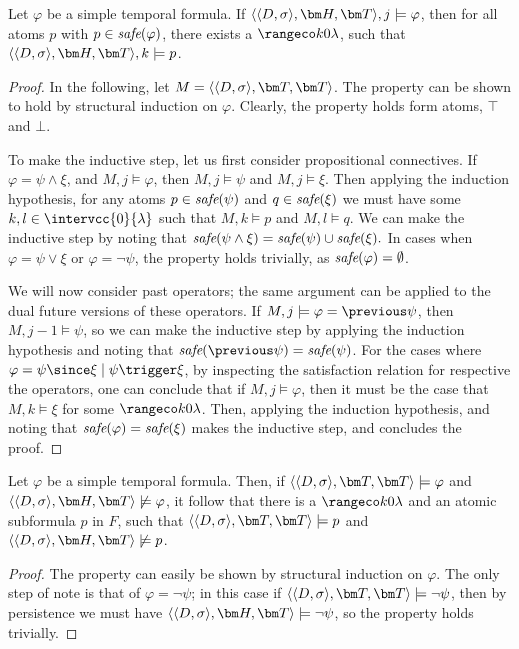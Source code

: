 \begin{lemma}\label{lemma:safe-atomic-subformula-satisfied}
  Let $\varphi$ be a simple temporal formula. If
  $\qthandt,j \models \varphi$, then for all atoms $p$ with
  $p \in \textit{safe}(\varphi)$, there exists a $\kinlambda$, such that
  $\qthandt,k \models p$.
\end{lemma}
\begin{proof}
  In the following, let $M=\qttandt$. The property can be shown to
  hold by structural induction on $\varphi$. Clearly, the property
  holds form atoms, $\top$ and $\bot$.

To make the inductive step, let us first consider propositional
connectives. If $\varphi = \psi \wedge \xi$, and $M,j \models
\varphi$, then $M,j \models \psi$ and $M,j \models \xi$. Then applying
the induction hypothesis, for any atoms $p \in \textit{safe}(\psi)$ and $q \in
\textit{safe}(\xi)$ we must have some $k,l \in \intervcc{0}{\lambda}$ such
that $M,k \models p$ and $M,l \models q$. We can make the
inductive step by noting that $\textit{safe}(\psi \wedge \xi) = \textit{safe}(\psi)
\cup \textit{safe}(\xi).$ In cases when $\varphi = \psi \vee \xi$ or $\varphi
= \neg \psi$, the property holds trivially, as $\textit{safe}(\varphi) =
\emptyset$.

We will now consider past operators; the same argument can be applied
to the dual future versions of these operators. If
$M,j \models \varphi = \previous \psi$, then $M,j-1 \models \psi$, so
we can make the inductive step by applying the induction hypothesis
and noting that $\safe{\previous \psi} = \safe{\psi}$. For the cases
where $\varphi = \psi \since \xi \mid \psi \trigger \xi$, by
inspecting the satisfaction relation for respective the operators, one
can conclude that if $M,j \models \varphi$, then it must be the case
that $M,k \models \xi$ for some $\kinlambda$. Then, applying the
induction hypothesis, and noting that $\textit{safe}(\varphi) = \textit{safe}(\xi)$
makes the inductive step, and concludes the proof.
  
\end{proof}

\begin{lemma}\label{lemma:t-not-h-atomic-subformula}
  Let $\varphi$ be a simple temporal formula. Then, if
  $\qttandt \models \varphi$ and \\
  $\qthandt \not\models \varphi$, it follow that there is a
  $\kinlambda$ and an atomic subformula $p$ in $F$, such that
  $\qttandt \models p$ and $\qthandt \not\models p$.
\end{lemma}
\begin{proof}
  The property can easily be shown by structural induction on
  $\varphi$. The only step of note is that of $\varphi = \neg \psi$;
  in this case if $\qttandt \models \neg \psi$, then by
  persistence we must have $\qthandt \models \neg \psi$, so the
  property holds trivially.
\end{proof}



